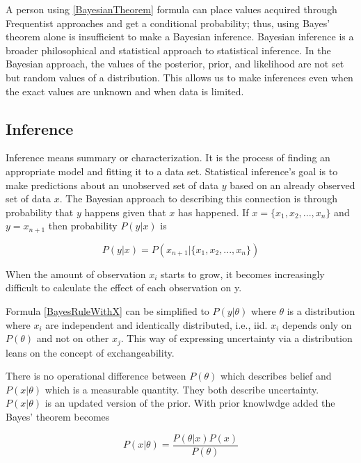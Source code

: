 A person using \ref{BayesianTheorem} formula can place values acquired through Frequentist approaches and get a conditional probability; thus, using Bayes' theorem alone is insufficient to make a Bayesian inference. Bayesian inference is a broader philosophical and statistical approach to statistical inference.\cite{Mcelreath2015StatisticalRA} In the Bayesian approach, the values of the posterior, prior, and likelihood are not set but random values of a distribution.\cite{Gut2005ProbabilityAG} This allows us to make inferences even when the exact values are unknown and when data is limited.

\subsection{Inference}\label{Inference}

Inference means summary or characterization.\cite{Robert2007TheBC} It is the process of finding an appropriate model and fitting it to a data set.\cite{Gel2014BayesianDA} Statistical inference's goal is to make predictions about an unobserved set of data $y$ based on an already observed set of data $x$.\cite{Lindley1990The1W}\cite{Gel2014BayesianDA} The Bayesian approach to describing this connection is through probability that $y$ happens given that $x$ has happened. If $x = \{x_1, x_2, ..., x_n \}$ and $y = x_{n + 1}$ then probability $P(y|x)$ is

\begin{equation}\label{BayesRuleWithX}
P(y|x) = P(x_{n + 1}|\{x_1, x_2, ..., x_n \})
\end{equation}

When the amount of observation $x_i$ starts to grow, it becomes increasingly difficult to calculate the effect of each observation on y. 

Formula \ref{BayesRuleWithX} can be simplified to $P(y|\theta)$ where $\theta$ is a distribution where $x_i$ are independent and identically distributed, i.e., iid. $x_i$ depends only on $P(\theta)$ and not on other $x_j$.\cite{Lindley1990The1W} This way of expressing uncertainty via a distribution leans on the concept of exchangeability.\cite{Gel2014BayesianDA}

There is no operational difference between $P(\theta)$ which describes belief and $P(x|\theta)$ which is a measurable quantity. They both describe uncertainty. $P(x|\theta)$ is an updated version of the prior. With prior knowlwdge added the Bayes' theorem becomes

\begin{equation}
P(x|\theta) = \frac{P(\theta|x)P(x)}{P(\theta)}
\end{equation}
\cite{Pawitan2002InAL}

